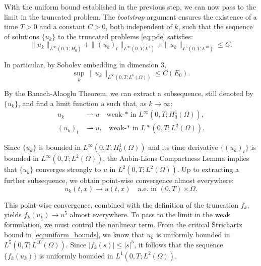 \documentclass[11pt,letterpaper]{amsart}
\begin{document}
With the uniform bound established in the previous step, we can now pass to the limit in the truncated problem. The \textit{bootstrap} argument ensures the existence of a time $T > 0$ and a constant $C > 0$, both independent of $k$, such that the sequence of solutions $\{u_k\}$ to the truncated problems \eqref{eq:pde} satisfies:
\begin{equation}\label{eq:uniform_bounds}
\|u_k\|_{L^\infty(0,T; H_0^1)} + \|(u_k)_t\|_{L^\infty(0,T; L^2)} + \|u_k\|_{L^5(0,T; L^{10})} \le C.
\end{equation}

In particular, by Sobolev embedding in dimension $3$,
\begin{equation}\label{eq:uk-L6}
\sup_{k}\,\|u_k\|_{L^\infty(0,T;L^6(\Omega))}\le C(E_0).
\end{equation}

By the Banach-Alaoglu Theorem, we can extract a subsequence, still denoted by $\{u_k\}$, and find a limit function $u$ such that, as $k \to \infty$:
\begin{align}
u_k &\rightharpoonup u \quad \text{weak-*} \text{ in } L^\infty(0,T; H_0^1(\Omega)), \\
(u_k)_t &\rightharpoonup u_t \quad \text{weak-*} \text{ in } L^\infty(0,T; L^2(\Omega)).
\end{align}

Since $\{u_k\}$ is bounded in $L^\infty(0,T; H_0^1(\Omega))$ and its time derivative $\{(u_k)_t\}$ is bounded in $L^\infty(0,T; L^2(\Omega))$, the Aubin-Lions Compactness Lemma implies that $\{u_k\}$ converges strongly to $u$ in $L^2(0,T; L^2(\Omega))$. Up to extracting a further subsequence, we obtain point-wise convergence almost everywhere:
\begin{equation}
u_k(t,x) \to u(t,x) \quad \text{a.e. in } (0,T) \times \Omega.
\end{equation}

This point-wise convergence, combined with the definition of the truncation $f_k$, yields $f_k(u_k) \to u^5$ almost everywhere. To pass to the limit in the weak formulation, we must control the nonlinear term. From the critical Strichartz bound in \eqref{eq:uniform_bounds}, we know that $u_k$ is uniformly bounded in $L^5(0,T; L^{10}(\Omega))$. Since $|f_k(s)| \le |s|^5$, it follows that the sequence $\{f_k(u_k)\}$ is uniformly bounded in $L^1(0,T; L^2(\Omega))$.
\end{document}
